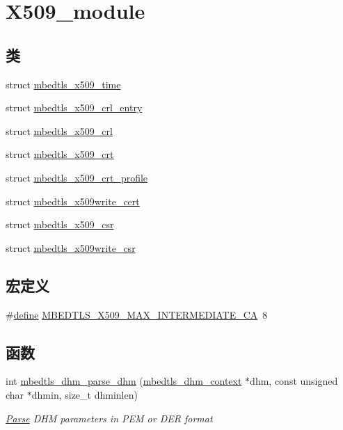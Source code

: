 \hypertarget{group__x509__module}{}\section{X509\+\_\+module}
\label{group__x509__module}
\subsection*{类}
\begin{DoxyCompactItemize}
\item 
struct \hyperlink{structmbedtls__x509__time}{mbedtls\+\_\+x509\+\_\+time}
\item 
struct \hyperlink{structmbedtls__x509__crl__entry}{mbedtls\+\_\+x509\+\_\+crl\+\_\+entry}
\item 
struct \hyperlink{structmbedtls__x509__crl}{mbedtls\+\_\+x509\+\_\+crl}
\item 
struct \hyperlink{structmbedtls__x509__crt}{mbedtls\+\_\+x509\+\_\+crt}
\item 
struct \hyperlink{structmbedtls__x509__crt__profile}{mbedtls\+\_\+x509\+\_\+crt\+\_\+profile}
\item 
struct \hyperlink{structmbedtls__x509write__cert}{mbedtls\+\_\+x509write\+\_\+cert}
\item 
struct \hyperlink{structmbedtls__x509__csr}{mbedtls\+\_\+x509\+\_\+csr}
\item 
struct \hyperlink{structmbedtls__x509write__csr}{mbedtls\+\_\+x509write\+\_\+csr}
\end{DoxyCompactItemize}
\subsection*{宏定义}
\begin{DoxyCompactItemize}
\item 
\#\hyperlink{structdefine}{define} \hyperlink{group__x509__module_gab98caf7dfede54b5c576b5a27a5c6a6a}{M\+B\+E\+D\+T\+L\+S\+\_\+\+X509\+\_\+\+M\+A\+X\+\_\+\+I\+N\+T\+E\+R\+M\+E\+D\+I\+A\+T\+E\+\_\+\+CA}~8
\end{DoxyCompactItemize}
\subsection*{函数}
\begin{DoxyCompactItemize}
\item 
int \hyperlink{group__x509__module_gae1bf556398cac1761aa2041908e9f619}{mbedtls\+\_\+dhm\+\_\+parse\+\_\+dhm} (\hyperlink{structmbedtls__dhm__context}{mbedtls\+\_\+dhm\+\_\+context} $\ast$dhm, const unsigned char $\ast$dhmin, size\+\_\+t dhminlen)
\begin{DoxyCompactList}\small\item\em \hyperlink{struct_parse}{Parse} D\+HM parameters in P\+EM or D\+ER format \end{DoxyCompactList}\end{DoxyCompactItemize}
